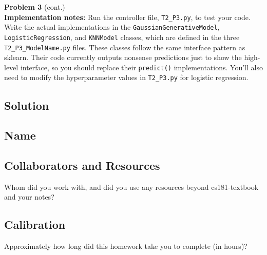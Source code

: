\documentclass[submit]{harvardml}
\begin{document}
\begin{framed}
\noindent\textbf{Problem 3} (cont.)\\


\textbf{Implementation notes:} Run the controller file, \texttt{T2\_P3.py},
to test your code. Write the actual implementations in the \texttt{GaussianGenerativeModel},
\texttt{LogisticRegression}, and \texttt{KNNModel} classes, which are defined in the three
\texttt{T2\_P3\_ModelName.py} files. These classes follow the same interface pattern
as sklearn. Their code
currently outputs nonsense predictions just to show the
high-level interface, so you should replace their \texttt{predict()} implementations.
You'll also need to modify the hyperparameter
values in \texttt{T2\_P3.py} for logistic regression.
\end{framed}


\subsection*{Solution}

\newpage
\subsection*{Name}

\subsection*{Collaborators and Resources}
Whom did you work with, and did you use any resources beyond cs181-textbook and your notes?

\subsection*{Calibration}
Approximately how long did this homework take you to complete (in hours)?
\end{document}
